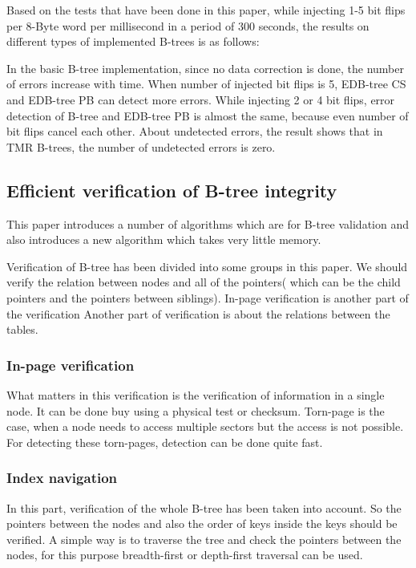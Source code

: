 \documentclass{report}
\begin{document}
Based on the tests that have been done in this paper, while injecting 1-5 bit flips per 8-Byte word per millisecond in a period of 300 seconds, the results on different types of implemented B-trees is as follows:

In the basic B-tree implementation, since no data correction is done, the number of errors increase with time. When number of injected bit flips is 5, EDB-tree CS and EDB-tree PB can detect more errors. While injecting 2 or 4 bit flips, error detection of B-tree and EDB-tree PB is almost the same, because even number of bit flips cancel each other. About undetected errors, the result shows that in TMR B-trees, the number of undetected errors is zero.               
  

\subsection{Efficient verification of B-tree integrity \cite{Graefe}}

This paper introduces a number of algorithms which are for B-tree validation and also introduces a new algorithm which takes very little memory.

Verification of B-tree has been divided into some groups in this paper. We should verify the relation between nodes and all of the pointers( which can be the child pointers and the pointers between siblings). In-page verification is another part of the verification Another part of verification is about the relations between the tables.
  
\subsubsection{In-page verification}

What matters in this verification is the verification of information in a single node. It can be done buy using a physical test or checksum. Torn-page is the case, when a node needs to access multiple sectors but the access is not possible. For detecting these torn-pages, detection can be done quite fast.

\subsubsection{Index navigation}

In this part, verification of the whole B-tree has been taken into account. So the pointers between the nodes and also the order of keys inside the keys should be verified. A simple way is to traverse the tree and check the pointers between the nodes, for this purpose breadth-first or depth-first traversal can be used.   
\end{document}
